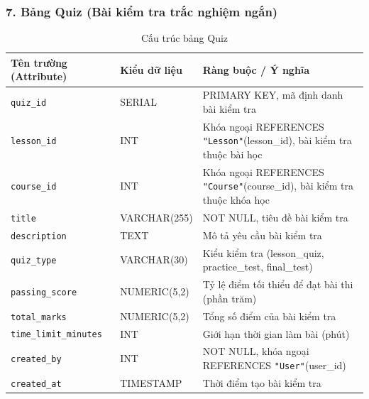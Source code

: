 \documentclass[../DoAn.tex]{subfiles}
\begin{document}
\subsubsection*{7. Bảng Quiz (Bài kiểm tra trắc nghiệm ngắn)}
\begin{table}[H]
\centering
\footnotesize
\renewcommand{\arraystretch}{1.2}
\begin{tabular}{|p{4.2cm}|p{3.2cm}|p{7.1cm}|}
\hline
\textbf{Tên trường (Attribute)} & \textbf{Kiểu dữ liệu} & \textbf{Ràng buộc / Ý nghĩa} \\
\hline
\texttt{quiz\_id} & SERIAL & PRIMARY KEY, mã định danh bài kiểm tra \\
\hline
\texttt{lesson\_id} & INT & Khóa ngoại REFERENCES \texttt{"Lesson"}(lesson\_id), bài kiểm tra thuộc bài học \\
\hline
\texttt{course\_id} & INT & Khóa ngoại REFERENCES \texttt{"Course"}(course\_id), bài kiểm tra thuộc khóa học \\
\hline
\texttt{title} & VARCHAR(255) & NOT NULL, tiêu đề bài kiểm tra \\
\hline
\texttt{description} & TEXT & Mô tả yêu cầu bài kiểm tra \\
\hline
\texttt{quiz\_type} & VARCHAR(30) & Kiểu kiểm tra (lesson\_quiz, practice\_test, final\_test) \\
\hline
\texttt{passing\_score} & NUMERIC(5,2) & Tỷ lệ điểm tối thiểu để đạt bài thi (phần trăm) \\
\hline
\texttt{total\_marks} & NUMERIC(5,2) & Tổng số điểm của bài kiểm tra \\
\hline
\texttt{time\_limit\_minutes} & INT & Giới hạn thời gian làm bài (phút) \\
\hline
\texttt{created\_by} & INT & NOT NULL, khóa ngoại REFERENCES \texttt{"User"}(user\_id) \\
\hline
\texttt{created\_at} & TIMESTAMP & Thời điểm tạo bài kiểm tra \\
\hline
\end{tabular}
\caption{Cấu trúc bảng Quiz}
\label{tab:schema_quiz}
\end{table}
\end{document}

